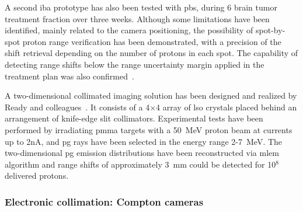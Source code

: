 A second \gls{iba} prototype has also been tested with \gls{pbs}, during 6 brain tumor treatment fraction over three weeks. Although some limitations have been identified, mainly related to the camera positioning, the possibility of spot-by-spot proton range verification has been demonstrated, with a precision of the shift retrieval depending on the number of protons in each spot. The capability of detecting range shifts below the range uncertainty margin applied in the treatment plan was also confirmed~\parencite{Xie2017}.

A two-dimensional collimated imaging solution has been designed and realized by Ready and colleagues~\parencite{Ready2016PHD, Ready2016}. It consists of a 4$\times$4 array of \gls{lso} crystals placed behind an arrangement of knife-edge slit collimators. Experimental tests have been performed by irradiating \gls{pmma} targets with a 50~MeV proton beam at currents up to 2nA, and \gls{pg} rays have been selected in the energy range 2-7~MeV. The two-dimensional \gls{pg} emission distributions have been reconstructed via \gls{mlem} algorithm and range shifts of approximately 3~mm could be detected for 10$^8$ delivered protons.  

\subsubsection{Electronic collimation: Compton cameras}\label{chap2::subsubsec::PGI_elecColl}


